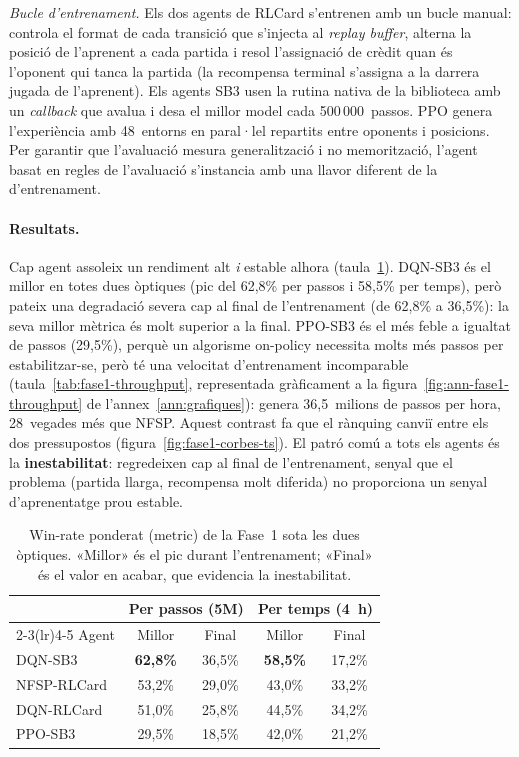 \emph{Bucle d'entrenament.} Els dos agents de RLCard s'entrenen
amb un bucle manual: controla el
format de cada transició que s'injecta al \emph{replay buffer}, alterna la posició de
l'aprenent a cada partida i resol l'assignació de crèdit quan és l'oponent qui tanca la
partida (la recompensa terminal s'assigna a la darrera jugada de l'aprenent). Els agents
\ac{SB3} usen la rutina nativa de la biblioteca amb un \emph{callback} que avalua i desa el
millor model cada 500\,000~passos. PPO genera l'experiència amb 48~entorns en paral·lel
repartits entre oponents i posicions. Per garantir que l'avaluació mesura generalització i
no memorització, l'agent basat en regles de l'avaluació s'instancia amb una llavor diferent
de la d'entrenament.

\paragraph{Resultats.} Cap agent assoleix un rendiment alt \emph{i} estable alhora
(taula~\ref{tab:fase1-resultats}). DQN-SB3 és el millor en totes dues òptiques (pic del
62{,}8\% per passos i 58{,}5\% per temps), però pateix una degradació severa cap al final
de l'entrenament (de 62{,}8\% a 36{,}5\%): la seva millor mètrica és molt superior a la
final. PPO-SB3 és el més feble a igualtat de passos (29{,}5\%), perquè un algorisme
on-policy necessita molts més passos per estabilitzar-se, però té una velocitat d'entrenament
incomparable (taula~\ref{tab:fase1-throughput}, representada gràficament a la
figura~\ref{fig:ann-fase1-throughput} de l'annex~\ref{ann:grafiques}): genera 36{,}5~milions de passos per hora,
28~vegades més que NFSP. Aquest contrast fa que el rànquing canviï entre els dos
pressupostos (figura~\ref{fig:fase1-corbes-ts}).
El patró comú a tots els agents és la \textbf{inestabilitat}: regredeixen cap al final de
l'entrenament, senyal que el problema (partida llarga, recompensa molt diferida) no
proporciona un senyal d'aprenentatge prou estable.

\begin{table}[H]
  \centering
  \begin{tabular}{lcccc}
    \toprule
    & \multicolumn{2}{c}{Per passos (5M)} & \multicolumn{2}{c}{Per temps (4~h)} \\
    \cmidrule(lr){2-3}\cmidrule(lr){4-5}
    Agent & Millor & Final & Millor & Final \\
    \midrule
    DQN-SB3     & \textbf{62{,}8\%} & 36{,}5\% & \textbf{58{,}5\%} & 17{,}2\% \\
    NFSP-RLCard & 53{,}2\% & 29{,}0\% & 43{,}0\% & 33{,}2\% \\
    DQN-RLCard  & 51{,}0\% & 25{,}8\% & 44{,}5\% & 34{,}2\% \\
    PPO-SB3     & 29{,}5\% & 18{,}5\% & 42{,}0\% & 21{,}2\% \\
    \bottomrule
  \end{tabular}
  \caption[Win-rate de la Fase~1 (millor i final).]{Win-rate ponderat (\(\text{metric}\)) de la Fase~1 sota les dues òptiques.
           «Millor» és el pic durant l'entrenament; «Final» és el valor en acabar, que
           evidencia la inestabilitat.}
  \label{tab:fase1-resultats}
\end{table}

